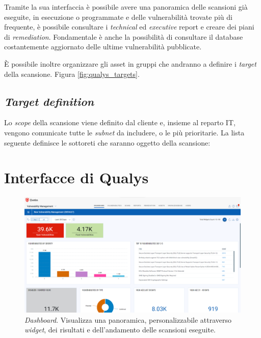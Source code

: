 \documentclass[target=mst,aauheader=]{thud}
\begin{document}
Tramite la sua interfaccia è possibile avere una panoramica delle scansioni già eseguite, in esecuzione o programmate e delle vulnerabilità trovate più di frequente, è possibile consultare i \textit{technical} ed \textit{executive} report e creare dei piani di \textit{remediation}. Fondamentale è anche la possibilità di consultare il database costantemente aggiornato delle ultime vulnerabilità pubblicate.

È possibile inoltre organizzare gli asset in gruppi che andranno a definire i \textit{target} della scansione. Figura \ref{fig:qualys_targets}.

\section{\textit{Target definition}}
Lo \textit{scope} della scansione viene definito dal cliente e, insieme al reparto IT, vengono comunicate tutte le \textit{subnet} da includere, o le più prioritarie. La lista seguente definisce le sottoreti che saranno oggetto della scansione:


\appendix


\chapter{Interfacce di Qualys}
\label{appendix:a}

\begin{figure}
\centering
    \includegraphics[scale=0.329]{images/qualys_dashboard.png}
    \caption{\textit{Dashboard}. Visualizza una panoramica, personalizzabile attraverso \textit{widget}, dei risultati e dell'andamento delle scansioni eseguite.}
\end{figure}
\end{document}
